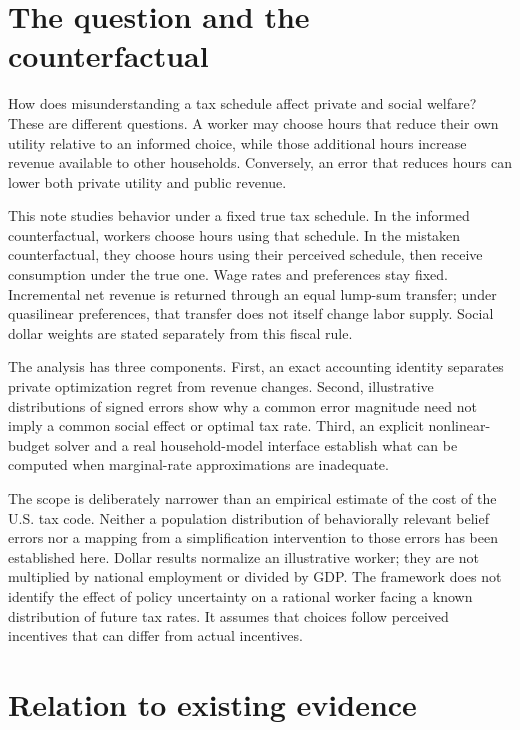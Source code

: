 \documentclass[
  11pt,
  letterpaper,
  DIV=11,
  numbers=noendperiod]{scrartcl}
\begin{document}
\section{The question and the
counterfactual}\label{the-question-and-the-counterfactual}

How does misunderstanding a tax schedule affect private and social
welfare? These are different questions. A worker may choose hours that
reduce their own utility relative to an informed choice, while those
additional hours increase revenue available to other households.
Conversely, an error that reduces hours can lower both private utility
and public revenue.

This note studies behavior under a fixed true tax schedule. In the
informed counterfactual, workers choose hours using that schedule. In
the mistaken counterfactual, they choose hours using their perceived
schedule, then receive consumption under the true one. Wage rates and
preferences stay fixed. Incremental net revenue is returned through an
equal lump-sum transfer; under quasilinear preferences, that transfer
does not itself change labor supply. Social dollar weights are stated
separately from this fiscal rule.

The analysis has three components. First, an exact accounting identity
separates private optimization regret from revenue changes. Second,
illustrative distributions of signed errors show why a common error
magnitude need not imply a common social effect or optimal tax rate.
Third, an explicit nonlinear-budget solver and a real household-model
interface establish what can be computed when marginal-rate
approximations are inadequate.

The scope is deliberately narrower than an empirical estimate of the
cost of the U.S. tax code. Neither a population distribution of
behaviorally relevant belief errors nor a mapping from a simplification
intervention to those errors has been established here. Dollar results
normalize an illustrative worker; they are not multiplied by national
employment or divided by GDP. The framework does not identify the effect
of policy uncertainty on a rational worker facing a known distribution
of future tax rates. It assumes that choices follow perceived incentives
that can differ from actual incentives.

\section{Relation to existing
evidence}\label{relation-to-existing-evidence}
\end{document}
